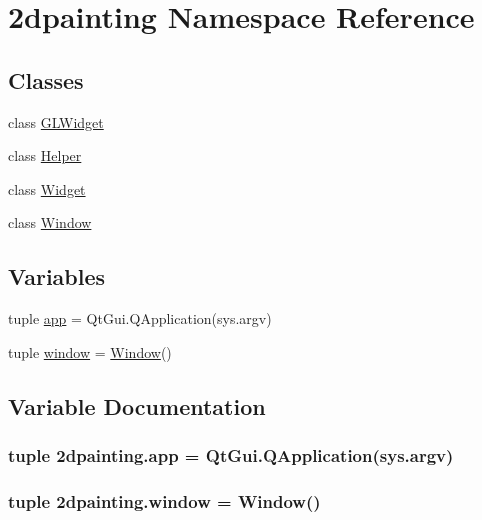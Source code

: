 \hypertarget{namespace2dpainting}{}\section{2dpainting Namespace Reference}
\label{namespace2dpainting}
\subsection*{Classes}
\begin{DoxyCompactItemize}
\item 
class \hyperlink{class2dpainting_1_1GLWidget}{G\+L\+Widget}
\item 
class \hyperlink{class2dpainting_1_1Helper}{Helper}
\item 
class \hyperlink{class2dpainting_1_1Widget}{Widget}
\item 
class \hyperlink{class2dpainting_1_1Window}{Window}
\end{DoxyCompactItemize}
\subsection*{Variables}
\begin{DoxyCompactItemize}
\item 
tuple \hyperlink{namespace2dpainting_a60dbc8bf1cea2943857ac87eae948de7}{app} = Qt\+Gui.\+Q\+Application(sys.\+argv)
\item 
tuple \hyperlink{namespace2dpainting_ad86c506d971f0723e89eca67a2791abc}{window} = \hyperlink{class2dpainting_1_1Window}{Window}()
\end{DoxyCompactItemize}


\subsection{Variable Documentation}
\hypertarget{namespace2dpainting_a60dbc8bf1cea2943857ac87eae948de7}{}
\subsubsection[{app}]{\setlength{\rightskip}{0pt plus 5cm}tuple 2dpainting.\+app = Qt\+Gui.\+Q\+Application(sys.\+argv)}\label{namespace2dpainting_a60dbc8bf1cea2943857ac87eae948de7}
\hypertarget{namespace2dpainting_ad86c506d971f0723e89eca67a2791abc}{}
\subsubsection[{window}]{\setlength{\rightskip}{0pt plus 5cm}tuple 2dpainting.\+window = {\bf Window}()}\label{namespace2dpainting_ad86c506d971f0723e89eca67a2791abc}

